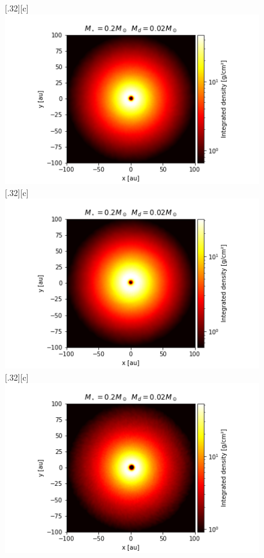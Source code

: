\documentclass[aps,prb,twocolumn,superscriptaddress,floatfix,longbibliography]{revtex4-2}
\begin{document}
\begin{appendices}
\begin{figure}[!htbp]
  \subcaptionbox*{}[.32\linewidth][c]{%
    \includegraphics[width=\linewidth]{Graphs_2D/r_0.2s_0.02d_0.3q_2D.png}}\quad
    \vspace{-2\baselineskip}
  \subcaptionbox*{}[.32\linewidth][c]{%
    \includegraphics[width=\linewidth]{Graphs_2D/r_0.2s_0.02d_0.5q_2D.png}}\quad
  \subcaptionbox*{}[.32\linewidth][c]{%
    \includegraphics[width=\linewidth]{Graphs_2D/r_0.2s_0.02d_0.7q_2D.png}}\quad

\end{figure}
\end{appendices}
\end{document}
